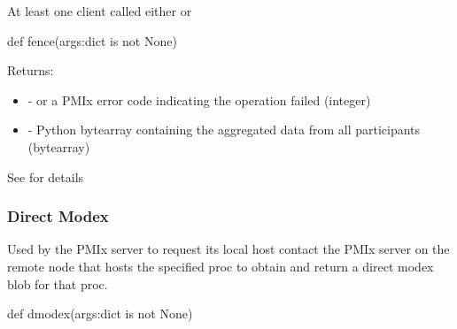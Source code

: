 At least one client called either  or 

\format

\pyspecificstart
\begin{codepar}
def fence(args:dict is not None)
\end{codepar}
\pyspecificend

\begin{arglist}
\end{arglist}

Returns:
\begin{itemize}
    \item {} -  or a \ac{PMIx} error code indicating the operation failed (integer)
    \item {} - Python bytearray containing the aggregated data from all participants (bytearray)
\end{itemize}

See  for details


\subsubsection{Direct Modex}

\summary

Used by the PMIx server to request its local host contact the \ac{PMIx} server on the remote node that hosts the specified proc to obtain and return a direct modex blob for that proc.

\format

\pyspecificstart
\begin{codepar}
def dmodex(args:dict is not None)
\end{codepar}
\pyspecificend

